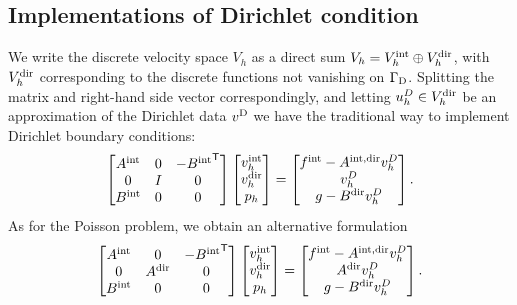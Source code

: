 \subsection{Implementations of Dirichlet condition}\label{subsec:}
%
We write the discrete velocity space $V_h$ as a direct sum $V_h = {V}^{\rm int}_h \oplus {V}^{\rm dir}_h$, with ${V}^{\rm dir}_h$ corresponding to the discrete functions not vanishing on $\Gamma_{\rm D}$. 
Splitting the matrix and right-hand side vector correspondingly, and letting $u^D_h\in {V}^{\rm dir}_h$ be an approximation of the Dirichlet data $v^{\rm D}$ we have the traditional way to implement Dirichlet boundary conditions:
%
\begin{equation}\label{eq:StokesDirTrad}
\begin{bmatrix}
{A}^{\rm int} & 0 & -{{B}^{\rm int}}^{\mathsf{T}}\\
0 & I & 0 \\
{B}^{\rm int} & 0 & 0
\end{bmatrix}
\begin{bmatrix}
{v}^{\rm int}_h\\
{v}^{\rm dir}_h\\
p_h
\end{bmatrix}
=
\begin{bmatrix}
{f}^{\rm int} - {A}^{\rm int, dir} v^D_h\\
v^D_h\\
g - {B}^{\rm dir} v^D_h
\end{bmatrix}.
\end{equation}
%
As for the Poisson problem, we obtain an alternative formulation   
%
\begin{equation}\label{eq:StokesDirNew}
\begin{bmatrix}
{A}^{\rm int} & 0 & -{{B}^{\rm int}}^{\mathsf{T}}\\
0 & {A}^{\rm dir} & 0 \\
{B}^{\rm int} & 0 & 0
\end{bmatrix}
\begin{bmatrix}
{v}^{\rm int}_h\\
{v}^{\rm dir}_h\\
p_h
\end{bmatrix}
=
\begin{bmatrix}
{f}^{\rm int} - {A}^{\rm int, dir} v^D_h\\
{A}^{\rm dir} v^D_h\\
g - {B}^{\rm dir} v^D_h
\end{bmatrix}.
\end{equation}
%
%
